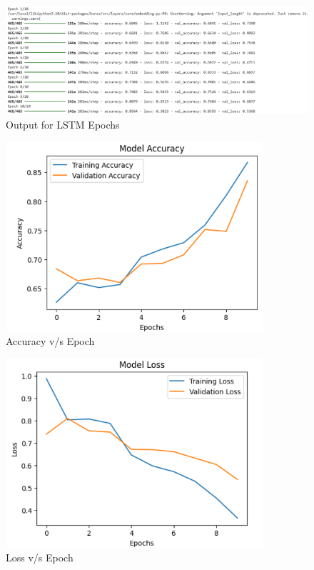 \begin{figure}[h!]  
    \centering
    \includegraphics[width=1.0\textwidth]{Images/LSTM Epoch.png}  
    \caption{Output for LSTM Epochs}
    \label{LSTm Epochs}  %
\end{figure}

\begin{figure}[h!]  
    \centering
    \includegraphics[width=0.85\textwidth]{Images/LSTM Accuracy v Epoch.png}  
    \caption{Accuracy v/s Epoch}
    \label{Accuracy vs Epoch LSTM}  %
\end{figure}

\begin{figure}[h!]  
    \centering
    \includegraphics[width=0.85\textwidth]{Images/LSTM Loss v Epoch.png}  
    \caption{Loss v/s Epoch}
    \label{Loss vs Epoch LSTM}  %
\end{figure}

